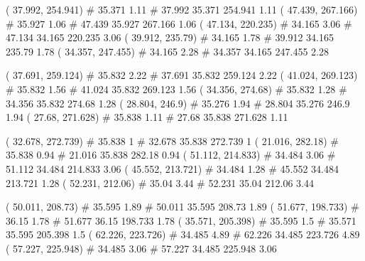 \documentclass[a4paper,openbib,10pt]{article}
\newenvironment{treegraph}{\begin{graph}}{\end{graph}}
\begin{document}
\begin{treegraph}
  ( 37.992, 254.941) #     35.371    1.11
   #    37.992    35.371    254.941    1.11
  ( 47.439, 267.166) #     35.927    1.06
   #    47.439    35.927    267.166    1.06
  ( 47.134, 220.235) #     34.165    3.06
   #    47.134    34.165    220.235    3.06
  ( 39.912, 235.79) #     34.165    1.78
   #    39.912    34.165    235.79    1.78
  ( 34.357, 247.455) #     34.165    2.28
   #    34.357    34.165    247.455    2.28

  ( 37.691, 259.124) #     35.832    2.22
   #    37.691    35.832    259.124    2.22
  ( 41.024, 269.123) #     35.832    1.56
   #    41.024    35.832    269.123    1.56
  ( 34.356, 274.68) #     35.832    1.28
   #    34.356    35.832    274.68    1.28
  ( 28.804, 246.9) #     35.276    1.94
   #    28.804    35.276    246.9    1.94
  ( 27.68, 271.628) #     35.838    1.11
   #    27.68    35.838    271.628    1.11

  ( 32.678, 272.739) #     35.838    1
   #    32.678    35.838    272.739    1
  ( 21.016, 282.18) #     35.838    0.94
   #    21.016    35.838    282.18    0.94
  ( 51.112, 214.833) #     34.484    3.06
   #    51.112    34.484    214.833    3.06
  ( 45.552, 213.721) #     34.484    1.28
   #    45.552    34.484    213.721    1.28
  ( 52.231, 212.06) #     35.04    3.44
   #    52.231    35.04    212.06    3.44

  ( 50.011, 208.73) #     35.595    1.89
   #    50.011    35.595    208.73    1.89
  ( 51.677, 198.733) #     36.15    1.78
   #    51.677    36.15    198.733    1.78
  ( 35.571, 205.398) #     35.595    1.5
   #    35.571    35.595    205.398    1.5
  ( 62.226, 223.726) #     34.485    4.89
   #    62.226    34.485    223.726    4.89
  ( 57.227, 225.948) #     34.485    3.06
   #    57.227    34.485    225.948    3.06


\end{treegraph}
\end{document}
